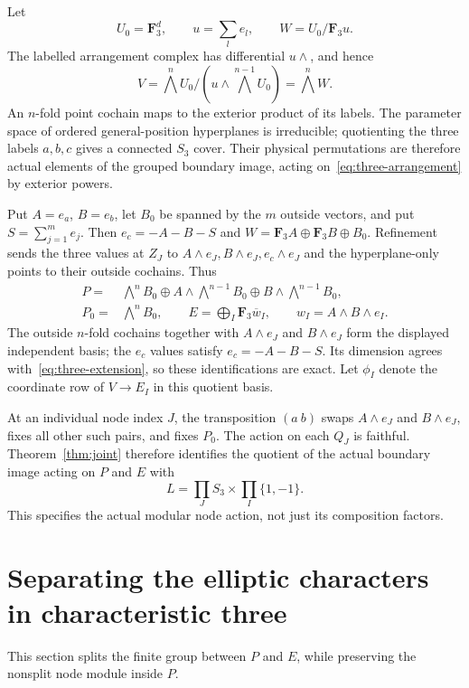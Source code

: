 Let
\[
U_0=\mathbf F_3^d,\qquad u=\sum_l e_l,\qquad
W=U_0/\mathbf F_3u.
\]
The labelled arrangement complex has differential $u\wedge$, and hence
\begin{equation}\label{eq:three-arrangement}
V=\bigwedge^nU_0/(u\wedge\bigwedge^{n-1}U_0)=\bigwedge^nW.
\end{equation}
An $n$-fold point cochain maps to the exterior product of its labels. The parameter space of ordered general-position hyperplanes is irreducible; quotienting the three labels $a,b,c$ gives a connected $S_3$ cover. Their physical permutations are therefore actual elements of the grouped boundary image, acting on~\eqref{eq:three-arrangement} by exterior powers.

Put $A=e_a$, $B=e_b$, let $B_0$ be spanned by the $m$ outside vectors, and put $S=\sum_{j=1}^m e_j$. Then $e_c=-A-B-S$ and $W=\mathbf F_3A\oplus\mathbf F_3B\oplus B_0$. Refinement sends the three values at $Z_J$ to $A\wedge e_J,B\wedge e_J,e_c\wedge e_J$ and the hyperplane-only points to their outside cochains. Thus
\begin{align}
P={}&\bigwedge^nB_0\oplus
 A\wedge\bigwedge^{n-1}B_0\oplus
 B\wedge\bigwedge^{n-1}B_0,\label{eq:three-P}\\
P_0={}&\bigwedge^nB_0,
\qquad E=\bigoplus_I\mathbf F_3\overline w_I,
\qquad w_I=A\wedge B\wedge e_I.\nonumber
\end{align}
The outside $n$-fold cochains together with $A\wedge e_J$ and $B\wedge e_J$ form the displayed independent basis; the $e_c$ values satisfy $e_c=-A-B-S$. Its dimension agrees with~\eqref{eq:three-extension}, so these identifications are exact. Let $\phi_I$ denote the coordinate row of $V\to E_I$ in this quotient basis.

At an individual node index $J$, the transposition $(a\ b)$ swaps $A\wedge e_J$ and $B\wedge e_J$, fixes all other such pairs, and fixes $P_0$. The action on each $Q_J$ is faithful. Theorem~\ref{thm:joint} therefore identifies the quotient of the actual boundary image acting on $P$ and $E$ with
\begin{equation}\label{eq:three-graded-group}
L=\prod_J S_3\times\prod_I\{1,-1\}.
\end{equation}
This specifies the actual modular node action, not just its composition factors.

\section{Separating the elliptic characters in characteristic three}\label{sec:higher-three-kernel}
This section splits the finite group between $P$ and $E$, while preserving the nonsplit node module inside $P$.

